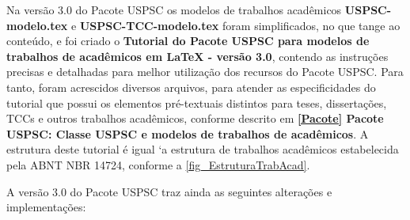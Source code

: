 Na versão 3.0 do Pacote USPSC os modelos de trabalhos acad\^emicos \textbf{USPSC-modelo.tex} e \textbf{USPSC-TCC-modelo.tex} foram simplificados, no que tange ao conteúdo, e foi criado o \textbf{Tutorial do Pacote USPSC para modelos de trabalhos de acad\^emicos em LaTeX - vers\~ao 3.0}, contendo as instruções precisas e detalhadas para melhor utilização dos recursos do Pacote USPSC. Para tanto, foram acrescidos diversos arquivos, para atender as especificidades do tutorial que possui os elementos pr\'e-textuais distintos para teses, dissertações, TCCs e outros trabalhos acad\^emicos, conforme descrito em  \textbf{\ref{Pacote} Pacote USPSC: Classe USPSC e modelos de trabalhos de acad\^emicos}. A estrutura deste tutorial \'e igual `a  estrutura de trabalhos acad\^emicos estabelecida pela ABNT NBR 14724, conforme a \autoref{fig_EstruturaTrabAcad}.		

A versão 3.0 do Pacote USPSC traz ainda as seguintes alterações e implementações:

